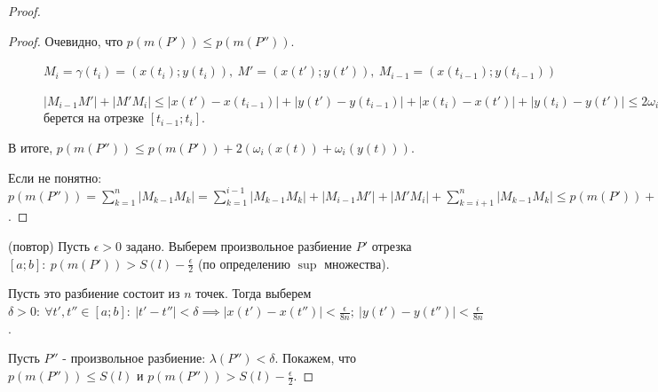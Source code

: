 \documentclass{report}
\theoremstyle{definition}
\begin{document}
\begin{proof}
\begin{proof}
    Очевидно, что $p(m(P')) \leqslant p(m(P''))$.
    \begin{figure}[h]
      \begin{minipage}[h]{0.49\linewidth}
      \end{minipage}
      \hfill
      \begin{minipage}[h]{0.49\linewidth}
        $M_i = \gamma (t_i) = (x(t_i);y(t_i)), \ M' = (x(t');y(t')), \ M_{i-1} =
          (x(t_{i-1});y(t_{i-1}))$

        $| M_{i-1}M' | + | M'M_i | \leqslant | x(t') - x(t_{i-1}) | + | y(t') - y(t_{i-1}) | + | x(t_i) - x(t') |
          + | y(t_i) - y(t') | \leqslant 2\omega_i(x(t)) + 2\omega_i(y(t)), \ \sup$ берется на отрезке
        $[t_{i-1};t_i]$.
      \end{minipage}
    \end{figure}

    В итоге, $p(m(P'')) \leqslant p(m(P')) + 2(\omega_i(x(t)) + \omega_i(y(t)))$.

    Если не понятно: $p(m(P'')) = \sum_{k=1}^{n}| M_{k-1} M_k | = \sum_{k=1}^{i-1}| M_{k-1}M_k | +
      | M_{i-1}M' | + | M'M_i | + \sum_{k=i+1}^{n}| M_{k-1}M_k | \leqslant p(m(P')) + 2(\omega_i(x(t))
      +\omega_i(y(t)))$.
  \end{proof}

  (повтор) Пусть $\epsilon > 0$ задано. Выберем произвольное разбиение $P'$ отрезка $[a;b]: \ p(m(P'))
    > S(l) - \frac{\epsilon}{2}$ (по определению $\sup$ множества).

  Пусть это разбиение состоит из $n$ точек. Тогда выберем $\delta > 0: \ \forall t',t'' \in [a;b]: \
    |t'-t''| < \delta \implies | x(t') - x(t'') | < \frac{\epsilon}{8n}; \ | y(t') - y(t'') | < \frac{\epsilon}
    {8n}$.

  Пусть $P''$ - произвольное разбиение: $\lambda(P'') < \delta$. Покажем, что $p(m(P'')) \leqslant S(l)$
  и $p(m(P'')) > S(l) - \frac{\epsilon}{2}$.


\end{proof}
\end{document}
